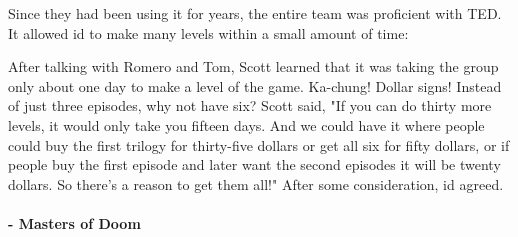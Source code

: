 \documentclass[book.tex]{subfiles}
\begin{document}
Since they had been using it for years, the entire team was proficient with TED. It allowed id to make many levels within a small amount of time:\\
\par

 \begin{fancyquotes}
After talking with Romero and Tom, Scott learned that it was taking the group only about one day to make a level of the game. Ka-chung! Dollar signs! Instead of just three episodes, why not have six? Scott said, "If you can do thirty more levels, it would only take you fifteen days. And we could have it where people could buy the first trilogy for thirty-five dollars or get all six for fifty dollars, or if people buy the first episode and later want the second episodes it will be twenty dollars. So there’s a reason to get them all!" After some consideration, id agreed.\\
\\
 \textbf{- Masters of Doom}
 \end{fancyquotes}\\
\end{document}
